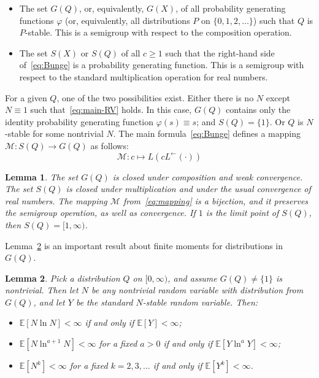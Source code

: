 \documentclass[12pt]{amsart}
\newtheorem{lemma}{Lemma}[section]
\theoremstyle{remark}
\theoremstyle{definition}
\begin{document}
\begin{itemize}
\item The set $G(Q)$, or, equivalently, $G(X)$, of all probability generating functions 
$\varphi$ (or, equivalently, all distributions $P$ on $\{0, 1, 2, \ldots\}$) such that $Q$ is $P$-stable. This is a semigroup with respect to the composition operation. 
\item The set $S(X)$ or $S(Q)$ of all $c \ge 1$ such that the right-hand side of~\eqref{eq:Bunge} is a probability generating function. This is a semigroup with respect to the standard multiplication operation for real numbers. 
\end{itemize}

For a given $Q$, one of the two possibilities exist. Either there is no $N$ except $N \equiv 1$ such that~\eqref{eq:main-RV} holds. In this case, $G(Q)$ contains only the identity probability generating function $\varphi(s) \equiv s$; and $S(Q) = \{1\}$. Or $Q$ is $N$-stable for some nontrivial $N$. The main formula~\eqref{eq:Bunge} defines a mapping $\mathcal M : S(Q) \to G(Q)$ as follows: 
\begin{equation}
\label{eq:mapping}
\mathcal M : c \mapsto L(cL^{\leftarrow}(\cdot))
\end{equation}

\begin{lemma} The set $G(Q)$ is closed under composition and weak convergence. The set $S(Q)$ is closed under multiplication and under the usual convergence of real numbers. The mapping $\mathcal M$ from~\eqref{eq:mapping} is a bijection, and it preserves the semigroup operation, as well as convergence. If $1$ is the limit point of $S(Q)$, then $S(Q) = [1, \infty)$. 
\label{lemma:limit-point}
\end{lemma}

Lemma~\ref{lemma:finite-moments} is an important result about finite moments for distributions in $G(Q)$. 

\begin{lemma} 
Pick a distribution $Q$ on $[0, \infty)$, and assume $G(Q) \ne \{1\}$ is nontrivial. Then let $N$ be any nontrivial random variable with distribution from $G(Q)$, and let $Y$ be the standard $N$-stable random variable. Then:
\begin{itemize} 
\item $\mathbb E[N\ln N] < \infty$ if and only if $\mathbb E[Y] < \infty$;
\item $\mathbb E[N\ln^{a+1} N] < \infty$ for a fixed $a > 0$ if and only if $\mathbb E[Y\ln^{a}Y] < \infty$;
\item $\mathbb E[N^k] < \infty$ for a fixed $k = 2, 3, \ldots$ if and only if $\mathbb E[Y^k] < \infty$. 
\end{itemize}
\label{lemma:finite-moments}
\end{lemma}
\end{document}
